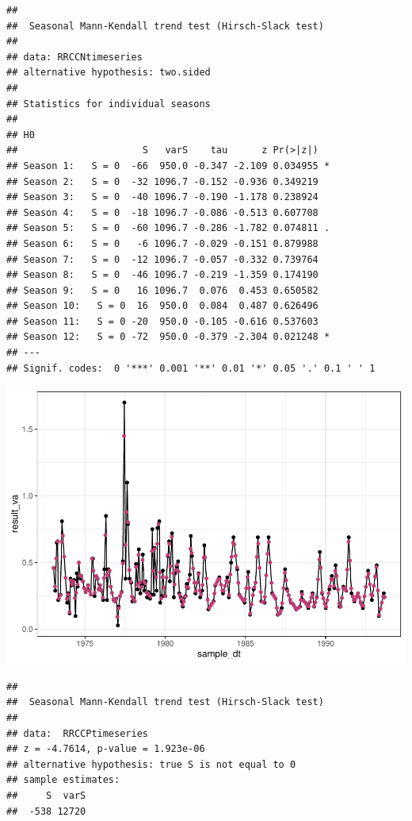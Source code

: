 \documentclass[12pt,]{article}
\begin{document}
\begin{verbatim}
## 
##  Seasonal Mann-Kendall trend test (Hirsch-Slack test)
## 
## data: RRCCNtimeseries
## alternative hypothesis: two.sided
## 
## Statistics for individual seasons
## 
## H0
##                      S   varS    tau      z Pr(>|z|)  
## Season 1:   S = 0  -66  950.0 -0.347 -2.109 0.034955 *
## Season 2:   S = 0  -32 1096.7 -0.152 -0.936 0.349219  
## Season 3:   S = 0  -40 1096.7 -0.190 -1.178 0.238924  
## Season 4:   S = 0  -18 1096.7 -0.086 -0.513 0.607708  
## Season 5:   S = 0  -60 1096.7 -0.286 -1.782 0.074811 .
## Season 6:   S = 0   -6 1096.7 -0.029 -0.151 0.879988  
## Season 7:   S = 0  -12 1096.7 -0.057 -0.332 0.739764  
## Season 8:   S = 0  -46 1096.7 -0.219 -1.359 0.174190  
## Season 9:   S = 0   16 1096.7  0.076  0.453 0.650582  
## Season 10:   S = 0  16  950.0  0.084  0.487 0.626496  
## Season 11:   S = 0 -20  950.0 -0.105 -0.616 0.537603  
## Season 12:   S = 0 -72  950.0 -0.379 -2.304 0.021248 *
## ---
## Signif. codes:  0 '***' 0.001 '**' 0.01 '*' 0.05 '.' 0.1 ' ' 1
\end{verbatim}

\includegraphics{Project_Template_files/figure-latex/unnamed-chunk-6-27.pdf}

\begin{verbatim}
## 
##  Seasonal Mann-Kendall trend test (Hirsch-Slack test)
## 
## data:  RRCCPtimeseries
## z = -4.7614, p-value = 1.923e-06
## alternative hypothesis: true S is not equal to 0
## sample estimates:
##     S  varS 
##  -538 12720
\end{verbatim}
\end{document}
